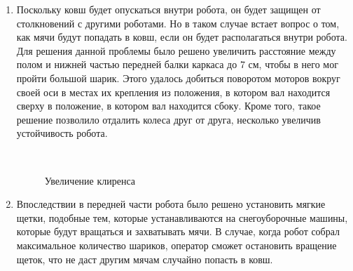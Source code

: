 \begin{enumerate}
\begin{enumerate}
      \item Поскольку ковш будет опускаться внутри робота, он будет защищен от столкновений с другими роботами. Но в таком случае встает вопрос о том, как мячи будут попадать в ковш, если он будет располагаться внутри робота. Для решения данной проблемы было решено увеличить расстояние между полом и нижней частью передней балки каркаса до 7 см, чтобы в него мог пройти большой шарик. Этого удалось добиться поворотом моторов вокруг своей оси в местах их крепления из положения, в котором вал находится сверху в положение, в котором вал находится сбоку. Кроме того, такое решение позволило отдалить колеса друг от друга, несколько увеличив устойчивость робота.
      
      \begin{figure}[H]
      	\begin{minipage}[h]{1\linewidth}
      		\caption{Увеличение клиренса} 
      	\end{minipage}
      \end{figure}
        
      \item Впоследствии в передней части робота было решено установить мягкие щетки, подобные тем, которые устанавливаются на снегоуборочные машины, которые будут вращаться и захватывать мячи. В случае, когда робот собрал максимальное количество шариков, оператор сможет остановить вращение щеток, что не даст другим мячам случайно попасть в ковш.
      

\end{enumerate}
\end{enumerate}
